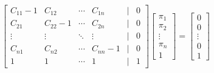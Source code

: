         \begin{equation}
            \begin{bmatrix}
                C_{11} - 1 & C_{12} & \cdots & C_{1n} & | & 0 \\
                C_{21} & C_{22} - 1 & \cdots & C_{2n} & | & 0 \\
                \vdots & \vdots & \ddots & \vdots & | & 0 \\
                C_{n1} & C_{n2} & \cdots & C_{nn} - 1 & | & 0 \\
                1 & 1 & \cdots & 1 & | & 1
            \end{bmatrix}
            \begin{bmatrix}
                \pi_1 \\
                \pi_2 \\
                \vdots \\
                \pi_n \\
                1
            \end{bmatrix}
            =
            \begin{bmatrix}
                0 \\
                0 \\
                \vdots \\
                0 \\
                1
            \end{bmatrix}
        \label{eq:c_pi_equation}
        \end{equation}
